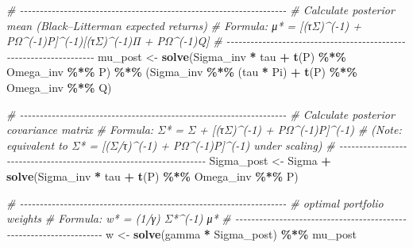 \documentclass[
  12pt,
]{article}
\newenvironment{Shaded}{\begin{snugshade}}{\end{snugshade}}
\newcommand{\CommentTok}[1]{\textcolor[rgb]{0.56,0.35,0.01}{\textit{#1}}}
\newcommand{\FunctionTok}[1]{\textcolor[rgb]{0.13,0.29,0.53}{\textbf{#1}}}
\newcommand{\NormalTok}[1]{#1}
\newcommand{\OtherTok}[1]{\textcolor[rgb]{0.56,0.35,0.01}{#1}}
\newcommand{\SpecialCharTok}[1]{\textcolor[rgb]{0.81,0.36,0.00}{\textbf{#1}}}
\begin{document}
\begin{Shaded}
\begin{Highlighting}[]
  \CommentTok{\# {-}{-}{-}{-}{-}{-}{-}{-}{-}{-}{-}{-}{-}{-}{-}{-}{-}{-}{-}{-}{-}{-}{-}{-}{-}{-}{-}{-}{-}{-}{-}{-}{-}{-}{-}{-}{-}{-}{-}{-}{-}{-}{-}{-}{-}{-}{-}{-}{-}{-}{-}{-}{-}{-}{-}{-}{-}{-}{-}{-}{-}{-}{-}{-}{-}{-}{-}}
  \CommentTok{\# Calculate posterior mean (Black–Litterman expected returns)}
  \CommentTok{\# Formula: μ* = [(τΣ)\^{}({-}1) + P\textquotesingle{}Ω\^{}({-}1)P]\^{}({-}1)[(τΣ)\^{}({-}1)Π + P\textquotesingle{}Ω\^{}({-}1)Q]}
  \CommentTok{\# {-}{-}{-}{-}{-}{-}{-}{-}{-}{-}{-}{-}{-}{-}{-}{-}{-}{-}{-}{-}{-}{-}{-}{-}{-}{-}{-}{-}{-}{-}{-}{-}{-}{-}{-}{-}{-}{-}{-}{-}{-}{-}{-}{-}{-}{-}{-}{-}{-}{-}{-}{-}{-}{-}{-}{-}{-}{-}{-}{-}{-}{-}{-}{-}{-}{-}{-}}
\NormalTok{  mu\_post }\OtherTok{\textless{}{-}} \FunctionTok{solve}\NormalTok{(Sigma\_inv }\SpecialCharTok{*}\NormalTok{ tau }\SpecialCharTok{+} \FunctionTok{t}\NormalTok{(P) }\SpecialCharTok{\%*\%}\NormalTok{ Omega\_inv }\SpecialCharTok{\%*\%}\NormalTok{ P) }\SpecialCharTok{\%*\%}
\NormalTok{             (Sigma\_inv }\SpecialCharTok{\%*\%}\NormalTok{ (tau }\SpecialCharTok{*}\NormalTok{ Pi) }\SpecialCharTok{+} \FunctionTok{t}\NormalTok{(P) }\SpecialCharTok{\%*\%}\NormalTok{ Omega\_inv }\SpecialCharTok{\%*\%}\NormalTok{ Q)}

  \CommentTok{\# {-}{-}{-}{-}{-}{-}{-}{-}{-}{-}{-}{-}{-}{-}{-}{-}{-}{-}{-}{-}{-}{-}{-}{-}{-}{-}{-}{-}{-}{-}{-}{-}{-}{-}{-}{-}{-}{-}{-}{-}{-}{-}{-}{-}{-}{-}{-}{-}{-}{-}{-}{-}{-}{-}{-}{-}{-}{-}{-}{-}{-}{-}{-}{-}{-}{-}{-}}
  \CommentTok{\# Calculate posterior covariance matrix}
  \CommentTok{\# Formula: Σ* = Σ + [(τΣ)\^{}({-}1) + P\textquotesingle{}Ω\^{}({-}1)P]\^{}({-}1)}
  \CommentTok{\# (Note: equivalent to Σ* = [(Σ/τ)\^{}({-}1) + P\textquotesingle{}Ω\^{}({-}1)P]\^{}({-}1) under scaling)}
  \CommentTok{\# {-}{-}{-}{-}{-}{-}{-}{-}{-}{-}{-}{-}{-}{-}{-}{-}{-}{-}{-}{-}{-}{-}{-}{-}{-}{-}{-}{-}{-}{-}{-}{-}{-}{-}{-}{-}{-}{-}{-}{-}{-}{-}{-}{-}{-}{-}{-}{-}{-}{-}{-}{-}{-}{-}{-}{-}{-}{-}{-}{-}{-}{-}{-}{-}{-}{-}{-}}
\NormalTok{  Sigma\_post }\OtherTok{\textless{}{-}}\NormalTok{ Sigma }\SpecialCharTok{+} \FunctionTok{solve}\NormalTok{(Sigma\_inv }\SpecialCharTok{*}\NormalTok{ tau }\SpecialCharTok{+} \FunctionTok{t}\NormalTok{(P) }\SpecialCharTok{\%*\%}\NormalTok{ Omega\_inv }\SpecialCharTok{\%*\%}\NormalTok{ P)}

  \CommentTok{\# {-}{-}{-}{-}{-}{-}{-}{-}{-}{-}{-}{-}{-}{-}{-}{-}{-}{-}{-}{-}{-}{-}{-}{-}{-}{-}{-}{-}{-}{-}{-}{-}{-}{-}{-}{-}{-}{-}{-}{-}{-}{-}{-}{-}{-}{-}{-}{-}{-}{-}{-}{-}{-}{-}{-}{-}{-}{-}{-}{-}{-}{-}{-}{-}{-}{-}{-}}
  \CommentTok{\# optimal portfolio weights}
  \CommentTok{\# Formula: w* = (1/γ) Σ*\^{}({-}1) μ*}
  \CommentTok{\# {-}{-}{-}{-}{-}{-}{-}{-}{-}{-}{-}{-}{-}{-}{-}{-}{-}{-}{-}{-}{-}{-}{-}{-}{-}{-}{-}{-}{-}{-}{-}{-}{-}{-}{-}{-}{-}{-}{-}{-}{-}{-}{-}{-}{-}{-}{-}{-}{-}{-}{-}{-}{-}{-}{-}{-}{-}{-}{-}{-}{-}{-}{-}{-}{-}{-}{-}}
\NormalTok{  w }\OtherTok{\textless{}{-}} \FunctionTok{solve}\NormalTok{(gamma }\SpecialCharTok{*}\NormalTok{ Sigma\_post) }\SpecialCharTok{\%*\%}\NormalTok{ mu\_post}


\end{Highlighting}
\end{Shaded}
\end{document}
